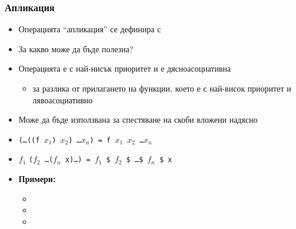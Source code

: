 \documentclass{beamer}
\begin{document}
\begin{frame}
  \frametitle{Апликация}

  \begin{itemize}[<+->]
  \item Операцията ``апликация'' се дефинира с 
  \item За какво може да бъде полезна?
  \item Операцията \lst{$} е с най-нисък приоритет и е дясноасоциативна
    \begin{itemize}
    \item за разлика от прилагането на функции, което е с най-висок приоритет и лявоасоциативно
    \end{itemize}
  \item Може да бъде използвана за спестяване на скоби вложени надясно
  \item \tt(\ldots\tt{((f} $x_1$\tt) $x_2$\tt) \ldots $x_n$\tt) = \tt f $x_1$ $x_2$ \ldots $x_n$
  \item $f_1$ \tt($f_2$ \ldots \tt($f_n$ \tt{x)}\ldots\tt) = $f_1$ \tt\$ $f_2$ \tt\$ \ldots \tt\$ $f_n$ \tt{\$ x}
  \item \textbf{Примери:}
    \begin{itemize}
    \item {}
    \item {}
    \item {}
    \end{itemize}
  \end{itemize}
\end{frame}
\end{document}
